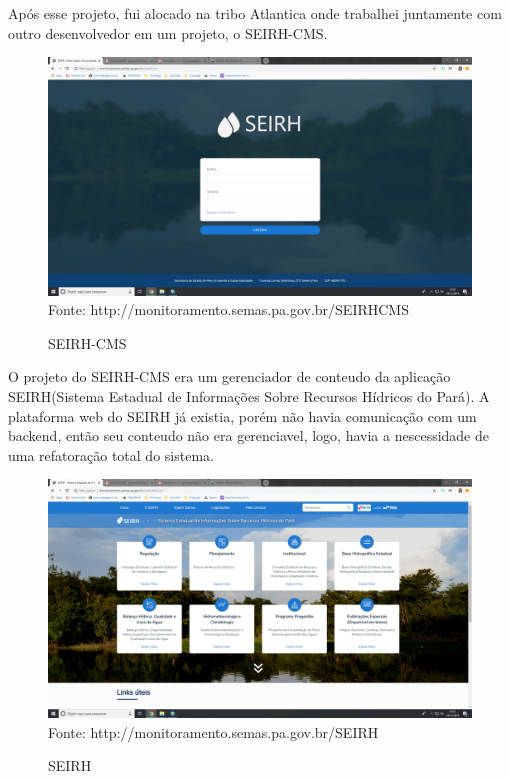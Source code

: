 Após esse projeto, fui alocado na tribo Atlantica onde trabalhei juntamente com outro desenvolvedor em um projeto, o SEIRH-CMS.

\begin{figure}[H]
\centering
\caption{SEIRH-CMS} %
\includegraphics[scale=0.22]{SEIRH-CMS}\\  %
{\small Fonte: http://monitoramento.semas.pa.gov.br/SEIRHCMS} %
\label{fig:exemplo} %
\end{figure}

O projeto do SEIRH-CMS era um gerenciador de conteudo da aplicação SEIRH(Sistema Estadual de Informações Sobre Recursos Hídricos do Pará).
A plataforma web do SEIRH já existia, porém não havia comunicação com um backend, então seu conteudo não era gerenciavel, logo, havia a nescessidade de uma refatoração total do sistema.

\begin{figure}[H]
\centering
\caption{SEIRH} %
\includegraphics[scale=0.22]{SEIRH}\\  %
{\small Fonte: http://monitoramento.semas.pa.gov.br/SEIRH} %
\label{fig:exemplo} %
\end{figure}

